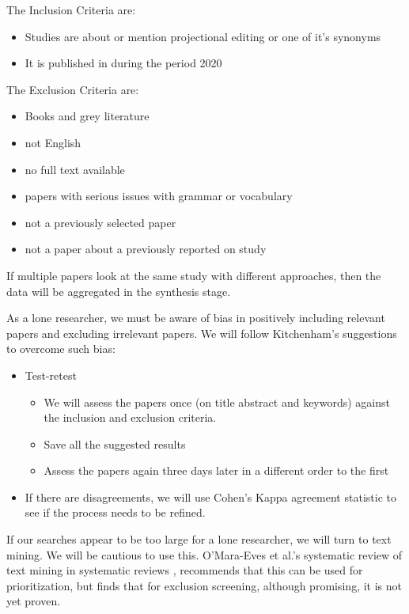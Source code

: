 The Inclusion Criteria are:
\begin{itemize}
       \item Studies are about or mention projectional editing or one of it's synonyms
       \item It is published in during the period 2020
\end{itemize}

The Exclusion Criteria are:
\begin{itemize}
       \item Books and grey literature
       \item not English
       \item no full text available
       \item papers with serious issues with grammar or vocabulary
       \item not a previously selected paper
       \item not a paper about a previously reported on study
\end{itemize}

If multiple papers look at the same study with different approaches, then the data will be aggregated in the synthesis stage.

As a lone researcher, we must be aware of bias in positively including relevant papers and excluding irrelevant papers.  
We will follow Kitchenham's suggestions to overcome such bias:
\begin{itemize}
       \item Test-retest 
       \begin{itemize}
              \item We will assess the papers once (on title abstract and keywords) against the inclusion and exclusion criteria.
              \item Save all the suggested results
              \item Assess the papers again three days later in a different order to the first  
       \end{itemize}
       \item If there are disagreements, we will use Cohen's Kappa agreement statistic \cite{Cohen_1960} to see if the process needs to be refined.
\end{itemize} 

If our searches appear to be too large for a lone researcher, we will turn to text mining.  
We will be cautious to use this.
O'Mara-Eves et al.'s systematic review of text mining in systematic reviews \cite{OMara-Eves_2015}, recommends that this can be used for prioritization, but finds that for exclusion screening, although promising, it is not yet proven.

